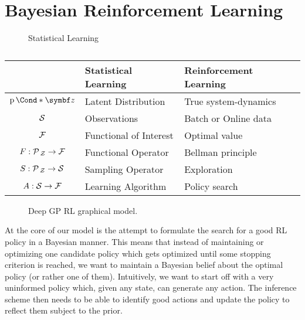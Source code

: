 \section{Bayesian Reinforcement Learning}
\begin{figure}[tp]
    \centering
    \caption{
        Statistical Learning
        \label{fig:mountaincar:statistical_learning}
    }
\end{figure}
\begin{table}[tp]
    \caption{
        \label{tab:mountaincar:quantities_of_interest}
    }
    \centering
    \begin{tabularx}{.9\textwidth}{cYY}
        \toprule
                                  & Statistical Learning   & Reinforcement Learning \\
        \midrule
        $\Prob*{\mat{z}}$         & Latent Distribution    & True system-dynamics   \\
        $\mathcal{S}$                     & Observations           & Batch or Online data   \\
        $\mathcal{F}$                     & Functional of Interest & Optimal value          \\
        \midrule
        $F : \operatorname{\mathcal{P}\mkern2mu}_{\mathcal{Z}} \to \mathcal{F}$ & Functional Operator    & Bellman principle      \\
        $S : \operatorname{\mathcal{P}\mkern2mu}_{\mathcal{Z}} \to \mathcal{S}$ & Sampling Operator      & Exploration            \\
        $A : \mathcal{S} \to \mathcal{F}$         & Learning Algorithm     & Policy search          \\
        \bottomrule
    \end{tabularx}
\end{table}
\begin{figure}[tp]
    \centering
    
    \caption{
        \label{fig:mountaincar:graphical_model}
        Deep GP RL graphical model.
    }
\end{figure}
At the core of our model is the attempt to formulate the search for a good RL policy in a Bayesian manner.
This means that instead of maintaining or optimizing one candidate policy which gets optimized until some stopping criterion is reached, we want to maintain a Bayesian belief about the optimal policy (or rather one of them).
Intuitively, we want to start off with a very uninformed policy which, given any state, can generate any action.
The inference scheme then needs to be able to identify good actions and update the policy to reflect them subject to the prior.
